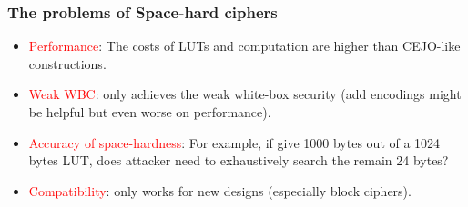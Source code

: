 \documentclass{beamer}
\begin{document}

\frame
{
\frametitle{The problems of Space-hard ciphers}
\begin{itemize}
\item \textcolor{red}{Performance}: The costs of LUTs and computation are higher than CEJO-like constructions.

\item \textcolor{red}{Weak WBC}: only achieves the weak white-box security (add encodings might be helpful but even worse on performance).

\item \textcolor{red}{Accuracy of space-hardness}: For example, if give 1000 bytes out of a 1024 bytes LUT, does attacker need to exhaustively search the remain 24 bytes?

\item \textcolor{red}{Compatibility}: only works for new designs (especially block ciphers).
\end{itemize}
}
\end{document}
